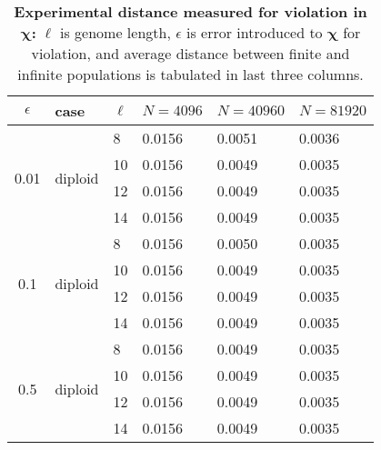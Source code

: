 
\begin{table}[ht]
\caption{\textbf{Experimental distance measured for violation in $\bm{\chi}$:} $\ell$ is genome length, 
$\epsilon$ is error introduced to $\bm{\chi}$ for violation, and average distance between finite and 
infinite populations is tabulated in last three columns.}
\centering
\begin{tabularx}{0.75\textwidth}{ c *{5}{X}}
\toprule
$\epsilon$ & case & $\ell$ & $N = 4096$ & $N = 40960$ & $N = 81920$  \\
\midrule
\multirow{4}{*}{0.01} & \multirow{4}{*}{diploid} 	& 8 & 0.0156	&  0.0051	& 0.0036 \\
		      &  	 			& 10 & 0.0156	&  0.0049	& 0.0035 \\
		      & 			 	& 12 & 0.0156	&  0.0049	& 0.0035 \\
		      &  	 			& 14 & 0.0156	&  0.0049	& 0.0035 \\
		      \midrule
\multirow{4}{*}{0.1}  & \multirow{4}{*}{diploid} 	& 8 & 0.0156	&  0.0050	& 0.0035 \\
		      &  	 			& 10 & 0.0156	&  0.0049	& 0.0035 \\
		      & 				& 12 & 0.0156	&  0.0049	& 0.0035 \\
		      &  	 			& 14 & 0.0156	&  0.0049	& 0.0035 \\
		      \midrule
\multirow{4}{*}{0.5}  & \multirow{4}{*}{diploid} 	& 8 & 0.0156	&  0.0049	& 0.0035 \\	
		      &  	 			& 10 & 0.0156	&  0.0049	& 0.0035 \\
		      &  				& 12 & 0.0156	&  0.0049	& 0.0035 \\
		      &  	 			& 14 & 0.0156	&  0.0049	& 0.0035 \\
\bottomrule
\end{tabularx}
\label{distanceChiDip}
\end{table} 


